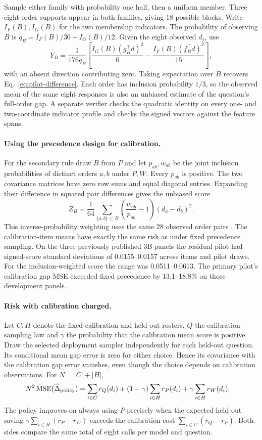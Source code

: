 Sample either family with probability one half, then a uniform member.
Three eight-order supports appear in both families, giving 18 possible
blocks. Write $I_F(B),I_G(B)$ for the two membership indicators.
The probability of observing $B$ is
$q_B=I_F(B)/30+I_G(B)/12$. Given the eight observed $d_j$, use
\[
 Y_B=\frac{1}{176q_B}
 \left[\frac{I_G(B)(g_B^\top d)^2}{6}-
       \frac{I_F(B)(f_B^\top d)^2}{15}\right],
\]
with an absent direction contributing zero. Taking expectation over
$B$ recovers Eq.~\eqref{eq:pilot-difference}. Each order has inclusion
probability $1/3$, so the observed mean of the same eight responses is
also an unbiased estimate of the question's full-order gap. A separate
verifier checks the quadratic identity on every one- and two-coordinate
indicator profile and checks the signed vectors against the feature spans.

\paragraph{Using the precedence design for calibration.}
For the secondary rule draw $B$ from $P$ and let $p_{ab},w_{ab}$ be
the joint inclusion probabilities of distinct orders $a,b$ under
$P,W$. Every $p_{ab}$ is positive. The two covariance matrices have
zero row sums and equal diagonal entries. Expanding their difference
in squared pair differences gives the unbiased score
\[
 Z_B=\frac1{64}\sum_{\{a,b\}\subset B}
 \left(\frac{w_{ab}}{p_{ab}}-1\right)(d_a-d_b)^2 .
\]
This inverse-probability weighting uses the same 28 observed order
pairs \citep{horvitz1952}. The calibration-item means have exactly
the same risk as under fixed precedence sampling. On the three
previously published 3B panels the residual pilot had signed-score
standard deviations of 0.0155--0.0157 across items and pilot draws.
For the inclusion-weighted score the range was 0.0511--0.0613.
The primary pilot's calibration gap MSE exceeded fixed precedence
by 13.1--18.8\% on those development panels.

\paragraph{Risk with calibration charged.}
Let $C,H$ denote the fixed calibration and held-out rosters,
$Q$ the calibration sampling law and $\gamma$ the probability that
the calibration mean score is positive. Draw the selected deployment
sampler independently for each held-out question. Its conditional
mean gap error is zero for either choice. Hence its covariance with
the calibration gap error vanishes, even though the choice depends
on calibration observations. For $N=|C|+|H|$,
\begin{align}
 N^2\operatorname{MSE}(\widehat\Delta_{\rm policy})
 &= \sum_{i\in C}r_Q(d_i)
 +(1-\gamma)\sum_{i\in H}r_P(d_i)
 +\gamma\sum_{i\in H}r_W(d_i).
 \label{eq:charged-pilot}
\end{align}
The policy improves on always using $P$ precisely when the
expected held-out saving $\gamma\sum_{i\in H}(r_P-r_W)$ exceeds
the calibration cost $\sum_{i\in C}(r_Q-r_P)$. Both sides compare
the same total of eight calls per model and question.

